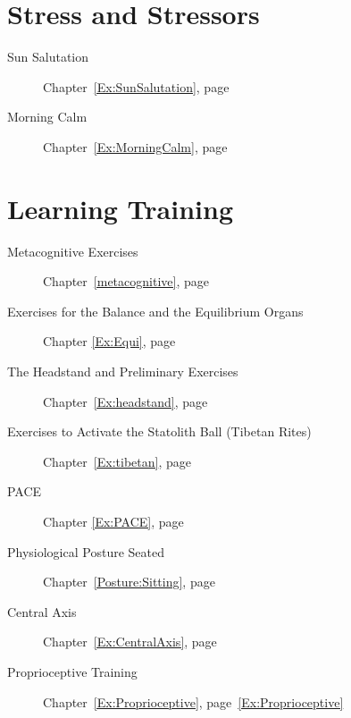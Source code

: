 \documentclass[../main.tex]{subfiles}
\begin{document}
%
\section{Stress and Stressors}

\begin{description}
  \item[Sun Salutation] Chapter~\ref{Ex:SunSalutation}, page~\pageref{Ex:SunSalutation}
\item[Morning Calm] Chapter~\ref{Ex:MorningCalm}, page~\pageref{Ex:MorningCalm}
  \end{description}

\section{Learning Training}
\begin{description} 
\item[Metacognitive Exercises] Chapter~\ref{metacognitive}, page~\pageref{metacognitive}
\item[Exercises for the Balance and the Equilibrium Organs] Chapter \ref{Ex:Equi}, page~\pageref{Ex:Equi}
\item[The Headstand and Preliminary Exercises] Chapter~\ref{Ex:headstand}, page~\pageref{Ex:headstand}
\item[Exercises to Activate the Statolith Ball (Tibetan Rites)] Chapter~\ref{Ex:tibetan}, page~\pageref{Ex:tibetan}
\item[PACE] Chapter \ref{Ex:PACE}, page \pageref{Ex:PACE}
\item[Physiological Posture Seated] Chapter~\ref{Posture:Sitting}, page~\pageref{Posture:Sitting}
\item[Central Axis] Chapter~\ref{Ex:CentralAxis}, page~\pageref{Ex:CentralAxis}
\item[Proprioceptive Training] Chapter~\ref{Ex:Proprioceptive}, page~\ref{Ex:Proprioceptive}
\end{description}
\end{document}
